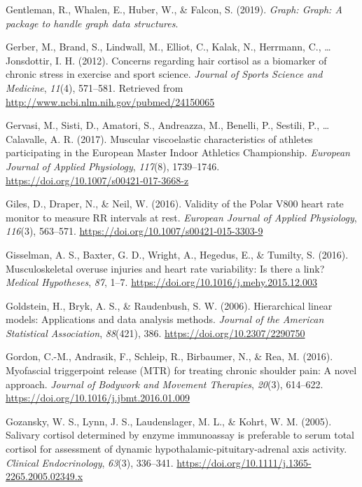 \documentclass[
  english,
  man,floatsintext]{apa6}
\begin{document}
\leavevmode\hypertarget{ref-R-graph}{}%
Gentleman, R., Whalen, E., Huber, W., \& Falcon, S. (2019). \emph{Graph: Graph: A package to handle graph data structures}.

\leavevmode\hypertarget{ref-Gerber2012}{}%
Gerber, M., Brand, S., Lindwall, M., Elliot, C., Kalak, N., Herrmann, C., \ldots{} Jonsdottir, I. H. (2012). Concerns regarding hair cortisol as a biomarker of chronic stress in exercise and sport science. \emph{Journal of Sports Science and Medicine}, \emph{11}(4), 571--581. Retrieved from \url{http://www.ncbi.nlm.nih.gov/pubmed/24150065}

\leavevmode\hypertarget{ref-Gervasi2017}{}%
Gervasi, M., Sisti, D., Amatori, S., Andreazza, M., Benelli, P., Sestili, P., \ldots{} Calavalle, A. R. (2017). Muscular viscoelastic characteristics of athletes participating in the European Master Indoor Athletics Championship. \emph{European Journal of Applied Physiology}, \emph{117}(8), 1739--1746. \url{https://doi.org/10.1007/s00421-017-3668-z}

\leavevmode\hypertarget{ref-Giles2016}{}%
Giles, D., Draper, N., \& Neil, W. (2016). Validity of the Polar V800 heart rate monitor to measure RR intervals at rest. \emph{European Journal of Applied Physiology}, \emph{116}(3), 563--571. \url{https://doi.org/10.1007/s00421-015-3303-9}

\leavevmode\hypertarget{ref-Gisselman2016}{}%
Gisselman, A. S., Baxter, G. D., Wright, A., Hegedus, E., \& Tumilty, S. (2016). Musculoskeletal overuse injuries and heart rate variability: Is there a link? \emph{Medical Hypotheses}, \emph{87}, 1--7. \url{https://doi.org/10.1016/j.mehy.2015.12.003}

\leavevmode\hypertarget{ref-Raudenbush2002}{}%
Goldstein, H., Bryk, A. S., \& Raudenbush, S. W. (2006). Hierarchical linear models: Applications and data analysis methods. \emph{Journal of the American Statistical Association}, \emph{88}(421), 386. \url{https://doi.org/10.2307/2290750}

\leavevmode\hypertarget{ref-Gordon2016}{}%
Gordon, C.-M., Andrasik, F., Schleip, R., Birbaumer, N., \& Rea, M. (2016). Myofascial triggerpoint release (MTR) for treating chronic shoulder pain: A novel approach. \emph{Journal of Bodywork and Movement Therapies}, \emph{20}(3), 614--622. \url{https://doi.org/10.1016/j.jbmt.2016.01.009}

\leavevmode\hypertarget{ref-Gozansky2005}{}%
Gozansky, W. S., Lynn, J. S., Laudenslager, M. L., \& Kohrt, W. M. (2005). Salivary cortisol determined by enzyme immunoassay is preferable to serum total cortisol for assessment of dynamic hypothalamic-pituitary-adrenal axis activity. \emph{Clinical Endocrinology}, \emph{63}(3), 336--341. \url{https://doi.org/10.1111/j.1365-2265.2005.02349.x}
\end{document}
